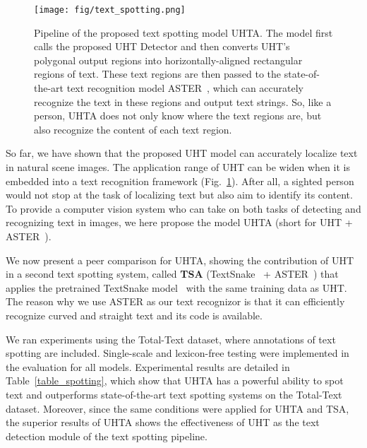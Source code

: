 \documentclass[10pt,twocolumn,letterpaper]{article}
\begin{document}
\begin{figure}[t]
\centering
\centering
\texttt{[image: fig/text\_spotting.png]}
\caption{Pipeline of the proposed text spotting model UHTA. The model first calls the proposed UHT Detector and then converts UHT's polygonal output regions into horizontally-aligned rectangular regions of text. These text regions are then passed to the state-of-the-art text recognition model ASTER~\cite{aster}, which can accurately recognize the text in these regions and output text strings. So, like a person, UHTA does not only know where the text regions are, but also recognize the content of each text region.}
\label{text_spotting}
\end{figure}



So far, we have shown that the proposed UHT model can accurately localize text in natural scene images. The application range of UHT can be widen when it is embedded into a text recognition framework (Fig.~\ref{text_spotting}). After all, a sighted person would not stop at the task of localizing text but also aim to identify its content.    
To provide a computer vision system who can take on both tasks of detecting and recognizing text in images, we here propose the model UHTA (short for UHT + ASTER~\cite{aster}). 

We now present a peer comparison for UHTA, showing the contribution of UHT in a second text spotting system,  called \textbf{TSA} (TextSnake~\cite{textsnake} + ASTER~\cite{aster}) that applies the pretrained TextSnake model~\cite{textsnake_pytorch_website} with the same training data as UHT. 
The reason why we use ASTER as our text recognizor is that it can efficiently recognize curved and straight text and its code is available. 


We ran experiments using the Total-Text dataset, where annotations of text spotting are included. Single-scale and lexicon-free testing were implemented in the evaluation
for all models.  Experimental results are detailed in Table~\ref{table_spotting}, which show that UHTA has a powerful ability to spot text and outperforms state-of-the-art text spotting systems on the Total-Text dataset. Moreover, since the same conditions were applied for UHTA and TSA, the superior results of UHTA shows the effectiveness of UHT as the text detection module of the text spotting pipeline.
\end{document}
